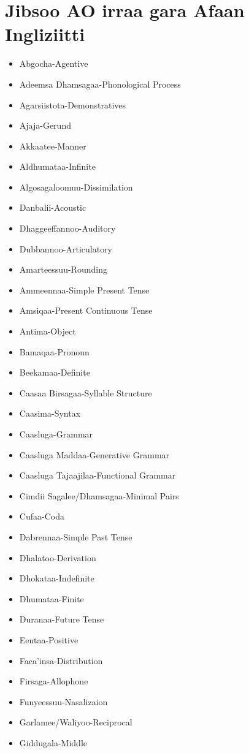 \documentclass[11pt,b5paper]{book}
\begin{document}
\newpage
\section*{Jibsoo AO irraa gara Afaan Ingliziitti}
\begin{itemize}
	\item Abgocha-Agentive
	\item Adeemsa Dhamsagaa-Phonological Process
	\item Agarsiistota-Demonstratives
	\item Ajaja-Gerund
	\item Akkaatee-Manner
	\item Aldhumataa-Infinite
	\item Algosagaloomuu-Dissimilation
	\item Danbalii-Acoustic
	\item Dhaggeeffannoo-Auditory
	\item Dubbannoo-Articulatory
	\item Amarteessuu-Rounding
	\item Ammeennaa-Simple Present Tense
	\item Amsiqaa-Present Continuous Tense
	\item Antima-Object
	\item Bamaqaa-Pronoun
	\item Beekamaa-Definite
	\item Caasaa Birsagaa-Syllable Structure
	\item Caasima-Syntax
	\item Caasluga-Grammar
	\item Caasluga Maddaa-Generative Grammar
	\item Caasluga Tajaajilaa-Functional Grammar
	\item Cimdii Sagalee/Dhamsagaa-Minimal Pairs
	\item Cufaa-Coda
	\item Dabrennaa-Simple Past Tense
	\item Dhalatoo-Derivation
	\item Dhokataa-Indefinite
	\item Dhumataa-Finite
	\item Duranaa-Future Tense
	\item Eentaa-Positive
	\item Faca'insa-Distribution
	\item Firsaga-Allophone
	\item Funyeessuu-Nasalizaion 
	\item Garlamee/Waliyoo-Reciprocal
	\item Giddugala-Middle

\end{itemize}
\end{document}
